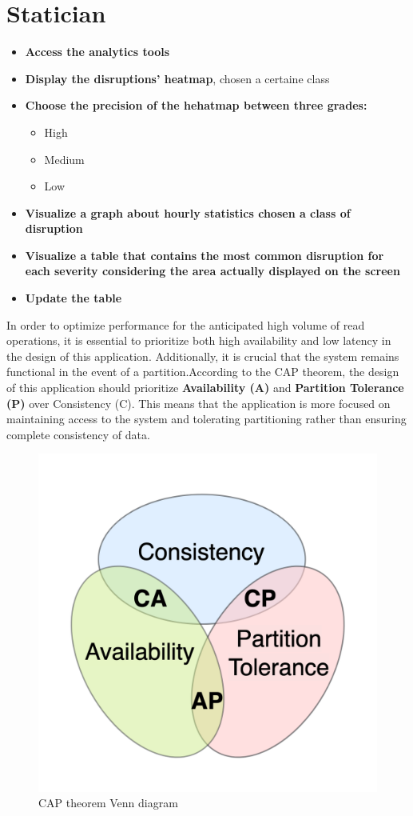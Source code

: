 \section{Statician}
\begin{itemize}
	\item \textbf{Access the analytics tools}
	\item \textbf{Display the disruptions' heatmap}, chosen a certaine class
	\item \textbf{Choose the precision of the hehatmap between three grades:}
		\begin{itemize}
		\item High
		\item Medium
		\item Low
		\end{itemize}
	\item \textbf{Visualize a graph about hourly statistics chosen a class of disruption}
	\item \textbf{Visualize a table that contains the most common disruption for each severity considering the area actually displayed on the screen}
	\item \textbf{Update the table}
\end{itemize}




In order to optimize performance for the anticipated high volume of read operations, it is essential to prioritize both high availability and low latency in the design of this application. Additionally, it is crucial that the system remains functional in the event of a partition.According to the CAP theorem, the design of this application should prioritize \textbf{Availability (A)} and \textbf{Partition Tolerance (P)} over Consistency (C). This means that the application is more focused on maintaining access to the system and tolerating partitioning rather than ensuring complete consistency of data.
\begin{figure}[H]
	\centering
	\includegraphics[width=0.4\linewidth]{assets/CAP_Theorem_Venn_Diagram}
	\caption{CAP theorem Venn diagram}
	\label{fig:captheoremvenndiagram}
\end{figure}






